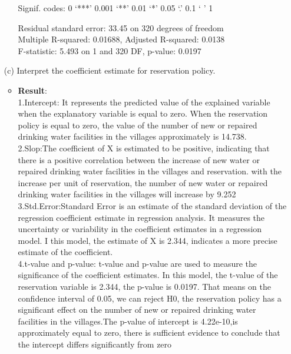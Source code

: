 \documentclass[12pt,letterpaper]{article}
\begin{document}
\begin{enumerate}
\begin{itemize}
		Signif. codes:  
		0 ‘***’ 0.001 ‘**’ 0.01 ‘*’ 0.05 ‘.’ 0.1 ‘ ’ 1
		
		Residual standard error: 33.45 on 320 degrees of freedom\\
		Multiple R-squared:  0.01688,	Adjusted R-squared:  0.0138 \\
		F-statistic: 5.493 on 1 and 320 DF,  p-value: 0.0197
		
	\end{itemize}
	
	
	\vspace{1cm}
	\item [(c)] Interpret the coefficient estimate for reservation policy. 
		\begin{itemize}
		\item \textbf{Result}:\\
		1.Intercept: It represents the predicted value of the explained variable when the explanatory variable is equal to zero. When the reservation policy is equal to zero, the value of the number of new or repaired drinking water facilities in the villages approximately is 14.738.\\
		2.Slop:The coefficient of X is estimated to be positive, indicating that there is a positive correlation between the  increase of new water or repaired drinking water facilities in the villages and reservation. with the increase per unit of reservation, the number of new water or repaired drinking water facilities in the villages will increase by 9.252\\
		3.Std.Error:Standard Error is an estimate of the standard deviation of the regression coefficient estimate in regression analysis. It measures the uncertainty or variability in the coefficient estimates in a regression model. I this model, the estimate of X is 2.344, indicates a more precise estimate of the coefficient.\\
		4.t-value and p-value: t-value and p-value are used to measure the significance of the coefficient estimates. In this model, the t-value of the reservation variable is 2.344, the p-value is 0.0197. That means on the confidence interval of 0.05, we can reject H0, the reservation policy has a significant effect on the number of new or repaired drinking water facilities in the villages.The p-value of intercept is 4.22e-10,is approximately equal to zero, there is sufficient evidence to conclude that the intercept differs significantly from zero\\
		
	\end{itemize}
\end{enumerate}
\end{document}
